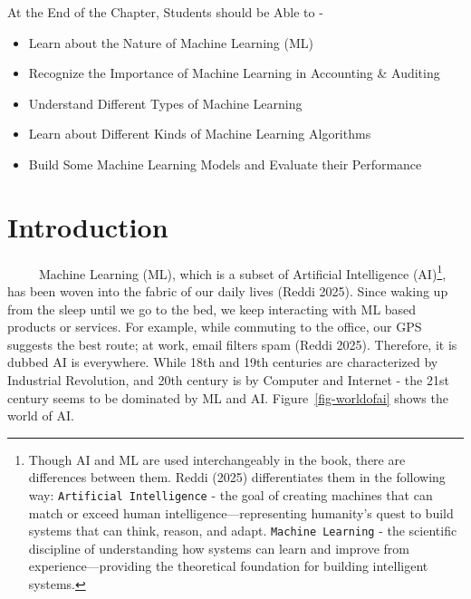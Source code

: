 \documentclass[
  letterpaper,
  DIV=11,
  numbers=noendperiod]{scrreprt}
\begin{document}
\begin{tcolorbox}[enhanced jigsaw, arc=.35mm, bottomrule=.15mm, bottomtitle=1mm, breakable, colback=white, colbacktitle=quarto-callout-note-color!10!white, colframe=quarto-callout-note-color-frame, coltitle=black, left=2mm, leftrule=.75mm, opacityback=0, opacitybacktitle=0.6, rightrule=.15mm, title=\textcolor{quarto-callout-note-color}{\faInfo}\hspace{0.5em}{Learning Objectives}, titlerule=0mm, toprule=.15mm, toptitle=1mm]

At the End of the Chapter, Students should be Able to -

\begin{itemize}
\item
  Learn about the Nature of Machine Learning (ML)
\item
  Recognize the Importance of Machine Learning in Accounting \& Auditing
\item
  Understand Different Types of Machine Learning
\item
  Learn about Different Kinds of Machine Learning Algorithms
\item
  Build Some Machine Learning Models and Evaluate their Performance
\end{itemize}

\end{tcolorbox}

\section{Introduction}\label{introduction-3}

~~~~~Machine Learning (ML), which is a subset of Artificial Intelligence
(AI)\footnote{Though AI and ML are used interchangeably in the book,
  there are differences between them. Reddi (2025) differentiates them
  in the following way: \texttt{Artificial\ Intelligence} - the goal of
  creating machines that can match or exceed human
  intelligence---representing humanity's quest to build systems that can
  think, reason, and adapt. \texttt{Machine\ Learning} - the scientific
  discipline of understanding how systems can learn and improve from
  experience---providing the theoretical foundation for building
  intelligent systems.}, has been woven into the fabric of our daily
lives (Reddi 2025). Since waking up from the sleep until we go to the
bed, we keep interacting with ML based products or services. For
example, while commuting to the office, our GPS suggests the best route;
at work, email filters spam (Reddi 2025). Therefore, it is dubbed AI is
everywhere. While 18th and 19th centuries are characterized by
Industrial Revolution, and 20th century is by Computer and Internet -
the 21st century seems to be dominated by ML and AI.
Figure~\ref{fig-worldofai} shows the world of AI.
\end{document}

